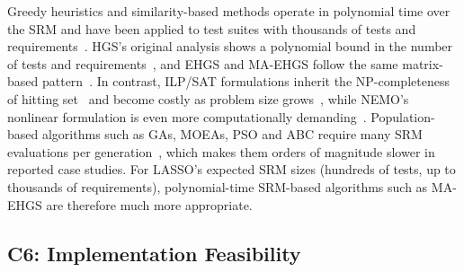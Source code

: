 \begin{appendices}
Greedy heuristics and similarity-based methods operate in polynomial time over the SRM and have been applied to test suites with thousands of tests and requirements~\cite{yoo2012,noemmer2020,jehan2023,bach2017}. HGS’s original analysis shows a polynomial bound in the number of tests and requirements~\cite{harrold1993}, and EHGS and MA-EHGS follow the same matrix-based pattern~\cite{gladston2015}. In contrast, ILP/SAT formulations inherit the NP-completeness of hitting set~\cite{garey1979} and become costly as problem size grows~\cite{elbaum2002,yoo2012}, while NEMO’s nonlinear formulation is even more computationally demanding~\cite{lin2018}. Population-based algorithms such as GAs, MOEAs, PSO and ABC require many SRM evaluations per generation~\cite{yoo2012,wei2017,ahuja2024}, which makes them orders of magnitude slower in reported case studies. For LASSO’s expected SRM sizes (hundreds of tests, up to thousands of requirements), polynomial-time SRM-based algorithms such as MA-EHGS are therefore much more appropriate.

\subsection{C6: Implementation Feasibility}\label{app:c6}


\end{appendices}
